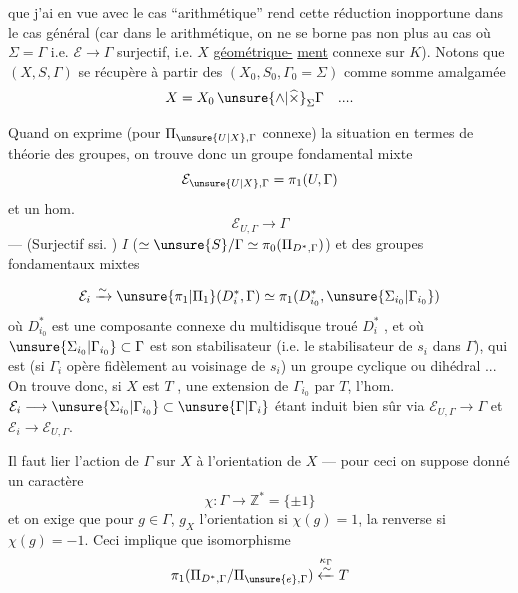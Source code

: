 
que j'ai en vue avec le cas ``arithmétique''
rend cette réduction inopportune dans le
cas général (car dans le  arithmétique,
on ne se borne pas non plus au cas où
$\Sigma=\Gamma$ i.e. $\mathcal E\longrightarrow\Gamma$ surjectif, i.e. 
$X$ \uline{géométrique-}
\uline{ment} connexe sur $K$). Notons  que
$(X,S,\Gamma)$ se récupère à partir des
$(X_0,S_0,\Gamma_0=\Sigma)$ comme somme amalgamée
\[
X=X_0\,\unsure{\wedge|\widehat\times}_{\Sigma}\Gamma\quad ....
\]

Quand on exprime (pour $\Pi_{\unsure{U|X},\Gamma}$ connexe)
la situation en termes de théorie des groupes,
on trouve donc  un groupe
fondamental  mixte
\[
\mathcal E_{\unsure{U|X},\Gamma}=\pi_1(U,\Gamma)
\]
et un hom.
\[
\mathcal E_{U,\Gamma}\longrightarrow\Gamma
\]
--- (Surjectif ssi. 
)
$I$ ($\simeq\unsure{S}/\Gamma\simeq\pi_0(\Pi_{D^*,\Gamma})$) et des
groupes fondamentaux mixtes


\[
\mathcal E_i\xrightarrow{\sim}\unsure{\pi_1|\Pi_1}(D_i^*,\Gamma)
\simeq\pi_1(D_{i_0}^*,\unsure{\Sigma_{i_0}|\Gamma_{i_0}})
\]
où $D_{i_0}^*$ est une composante connexe du
multidisque troué $D_i^*$ , et où $\unsure{\Sigma_{i_0}|\Gamma_{i_0}}\subset\Gamma$ est
son stabilisateur (i.e. le stabilisateur de
$s_i$ dans $\Gamma$), qui est  (si $\Gamma_i$  opère
fidèlement au voisinage de $s_i$) un groupe cyclique
ou dihédral ... On trouve donc, si $X$ est
$T$ , une extension de $\Gamma_{i_0}$ par $T$,
l'hom. $\mathcal E_i\longrightarrow\unsure{\Sigma_{i_0}|\Gamma_{i_0}}\subset\unsure{\Gamma|\Gamma_i}$ étant induit
bien sûr via $\mathcal E_{U,\Gamma}\longrightarrow\Gamma$ et $\mathcal E_i\longrightarrow\mathcal E_{U,\Gamma}$.

Il faut  lier l'action de $\Gamma$ sur $X$ à
l'orientation de $X$ --- pour ceci on suppose
donné un caractère
\[
\chi:\Gamma\longrightarrow\mathbb Z^*=\{\pm1\}
\]
et on exige que pour $g\in\Gamma$, $g_X$ 
l'orientation si $\chi(g)=1$, la renverse si $\chi(g)=-1$.
Ceci implique que  isomorphisme
\[
\pi_1(\Pi_{D^*,\Gamma}/\Pi_{\unsure{e},\Gamma})
\overset{\kappa_\Gamma}{\xleftarrow{\sim}}T
\]

